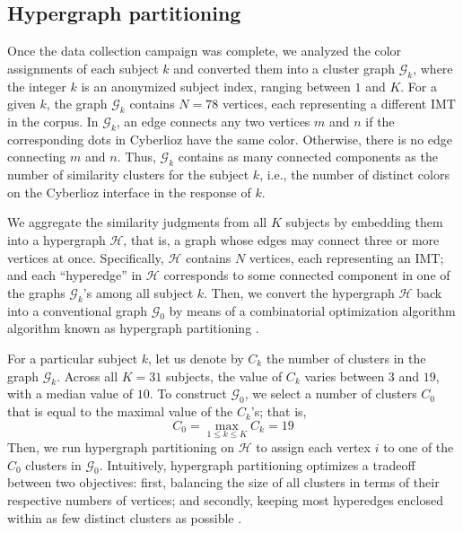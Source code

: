 \documentclass{bmcart}
\makeatletter
\newcommand*{\ie}{i.e.,\@\xspace}
\newcommand{\ipt}{IPT\xspace}
\makeatother
\begin{document}
\subsection*{Hypergraph partitioning}
Once the data collection campaign was complete, we analyzed the color assignments of each subject $k$ and converted them into a cluster graph $\mathcal{G}_k$, where the integer $k$ is an anonymized subject index, ranging between $1$ and $K$.
For a given $k$, the graph $\mathcal{G}_k$ contains $N=78$ vertices, each representing a different IMT in the corpus.
In $\mathcal{G}_k$, an edge connects any two vertices $m$ and $n$ if the corresponding dots in Cyberlioz have the same color.
Otherwise, there is no edge connecting $m$ and $n$.
Thus, $\mathcal{G}_k$ contains as many connected components as the number of similarity clusters for the subject $k$, \ie{} the number of distinct colors on the Cyberlioz interface in the response of $k$.


We aggregate the similarity judgments from all $K$ subjects by embedding them into a hypergraph $\mathcal{H}$, that is, a graph whose edges may connect three or more vertices at once.
Specifically, $\mathcal{H}$ contains $N$ vertices, each representing an IMT; and each ``hyperedge'' in $\mathcal{H}$ corresponds to some connected component in one of the graphs $\mathcal{G}_k$'s among all subject $k$.
Then, we convert the hypergraph $\mathcal{H}$ back into a conventional graph $\mathcal{G}_0$ by means of a combinatorial optimization algorithm algorithm known as hypergraph partitioning \cite{kernighan1970efficient}.

For a particular subject $k$, let us denote by $C_k$ the number of clusters in the graph $\mathcal{G}_k$.
Across all $K=31$ subjects, the value of $C_k$ varies between $3$ and $19$, with a median value of $10$.
To construct $\mathcal{G}_0$, we select a number of clusters $C_0$ that is equal to the maximal value of the $C_k$'s; that is,
\begin{equation}
C_0 = \max_{1\leq k \leq K} C_k = 19
\end{equation}
Then, we run hypergraph partitioning on $\mathcal{H}$ to assign each vertex $i$ to one of the $C_0$ clusters in $\mathcal{G}_0$.
Intuitively, hypergraph partitioning optimizes a tradeoff between two objectives: first, balancing the size of all clusters in terms of their respective numbers of vertices; and secondly, keeping most hyperedges enclosed within as few distinct clusters as possible \cite{han1997scalable,strehl2002cluster}.
\end{document}

